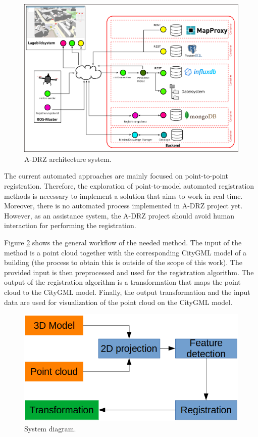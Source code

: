         \begin{figure}[H]
            \includegraphics[width=\textwidth]{images/Systemaufbau}
            \caption{A-DRZ architecture system.}
            \label{fig:adrz}
        \end{figure}

        The current automated approaches are mainly focused on point-to-point registration.
        Therefore, the exploration of point-to-model automated registration methods is necessary to implement a solution that aims to work in real-time.
        Moreover, there is no automated process implemented in A-DRZ project yet. 
        However, as an assistance system, the A-DRZ project should avoid human interaction for performing the registration.

        Figure \ref{fig:system_diagram} shows the general workflow of the needed method.
        The input of the method is a point cloud together with the corresponding CityGML model of a building  
        (the process to obtain this is outside of the scope of this work).
        The provided input is then preprocessed and used for the registration algorithm.
        The output of the registration algorithm is a transformation that maps the point cloud to the CityGML model.
        Finally, the output transformation and the input data are used for visualization of the point cloud on the CityGML model.

        \begin{figure}[H]
            \centering
            \includegraphics[scale=0.5]{images/RegistrationProcess}
            \caption{System diagram.}
            \label{fig:system_diagram}
        \end{figure}

